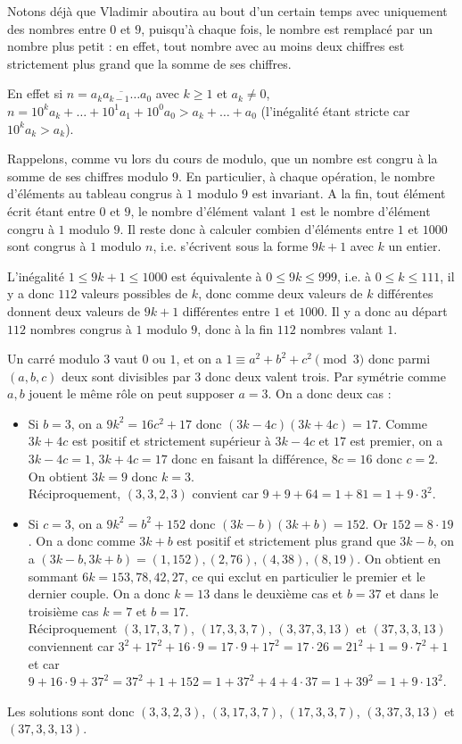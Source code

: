 \begin{sol}
Notons déjà que Vladimir aboutira au bout d'un certain temps avec uniquement des nombres entre $0$ et $9$, puisqu'à chaque fois, le nombre est remplacé par un nombre plus petit : en effet, tout nombre avec au moins deux chiffres est strictement plus grand que la somme de ses chiffres.

En effet si $n=\overline{a_ka_{k-1}\dots a_0}$ avec $k\ge 1$ et $a_k\neq 0$, $n=10^ka_k+\dots +10^1a_1+10^0a_0>a_k+\dots +a_0$ (l'inégalité étant stricte car $10^ka_k>a_k$). 

Rappelons, comme vu lors du cours de modulo, que un nombre est congru à la somme de ses chiffres modulo $9$. En particulier, à chaque opération, le nombre d'éléments au tableau congrus à $1$ modulo $9$ est invariant. A la fin, tout élément écrit étant entre $0$ et $9$, le nombre d'élément valant $1$ est le nombre d'élément congru à $1$ modulo $9$. Il reste donc à calculer combien d'éléments entre $1$ et $1000$ sont congrus à $1$ modulo $n$, i.e. s'écrivent sous la forme $9k+1$ avec $k$ un entier.

L'inégalité $1\le 9k+1\le 1000$ est équivalente à $0\le 9k \le 999$, i.e. à $0\le k \le 111$, il y a donc $112$ valeurs possibles de $k$, donc comme deux valeurs de $k$ différentes donnent deux valeurs de $9k+1$ différentes entre $1$ et $1000$. Il y a donc au départ $112$ nombres congrus à $1$ modulo $9$, donc à la fin $112$ nombres valant $1$.
\end{sol}


\begin{sol}
Un carré modulo $3$ vaut $0$ ou $1$, et on a $1\equiv a^2+b^2+c^2\pmod 3$ donc parmi $(a,b,c)$ deux sont divisibles par $3$ donc deux valent trois. Par symétrie comme $a,b$ jouent le même rôle on peut supposer $a=3$. On a donc deux cas : 
\begin{itemize}
\item Si $b=3$, on a $9k^2=16c^2+17$ donc $(3k-4c)(3k+4c)=17$. Comme $3k+4c$ est positif et strictement supérieur à $3k-4c$ et $17$ est premier, on a $3k-4c=1$, $3k+4c=17$ donc en faisant la différence, $8c=16$ donc $c=2$. On obtient $3k=9$ donc $k=3$. \\
Réciproquement, $(3,3,2,3)$ convient car $9+9+64=1+81=1+9\cdot 3^2$.
\item Si $c=3$, on a $9k^2=b^2+152$ donc $(3k-b)(3k+b)=152$. Or $152=8\cdot 19$. On a donc comme $3k+b$ est positif et strictement plus grand que $3k-b$, on a $(3k-b,3k+b)=(1,152),(2,76),(4,38),(8,19)$. On obtient en sommant $6k=153,78,42,27$, ce qui exclut en particulier le premier et le dernier couple. On a donc $k=13$ dans le deuxième cas et $b=37$ et dans le troisième cas $k=7$ et $b=17$. \\
Réciproquement $(3,17,3,7)$, $(17,3,3,7)$, $(3,37,3,13)$ et $(37,3, 3,13)$ conviennent car $3^2+17^2+16\cdot 9=17\cdot 9 +17^2=17\cdot 26=21^2+1=9\cdot 7^2+1$ et car $9+16\cdot 9 +37^2=37^2+1+152=1+37^2+4+4\cdot 37=1+39^2=1+9\cdot 13^2$.
\end{itemize}
Les solutions sont donc $(3, 3, 2, 3)$, $(3, 17, 3, 7)$, $(17, 3, 3, 7)$, $(3, 37, 3, 13)$ et $(37, 3, 3, 13)$.
\end{sol}